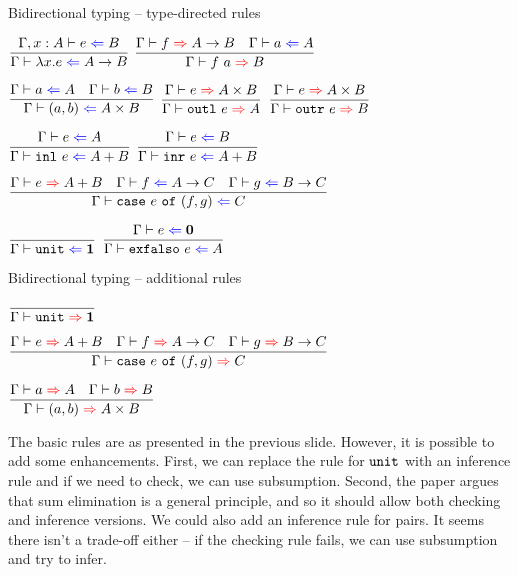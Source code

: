 \documentclass{beamer}
\begin{document}
\begin{frame}{Bidirectional typing -- type-directed rules}

\begin{center}
  $\infrule{\fullcheck{\extend{\Gamma}{x}{A}}{e}{B}}{\check{\fun{x}{e}}{\Fun{A}{B}}}$ \quad
  $\infrule{\infer{f}{\Fun{A}{B}} \quad \check{a}{A}}{\infer{\app{f}{a}}{B}}$

  \vspace{2em}

  $\infrule{\check{a}{A} \quad \check{b}{B}}{\check{\pair{a}{b}}{\Prod{A}{B}}}$ \quad
  $\infrule{\infer{e}{\Prod{A}{B}}}{\infer{\outl{e}}{A}}$ \quad
  $\infrule{\infer{e}{\Prod{A}{B}}}{\infer{\outr{e}}{B}}$

  \vspace{2em}

  $\infrule{\check{e}{A}}{\check{\inl{e}}{\Sum{A}{B}}}$ \quad
  $\infrule{\check{e}{B}}{\check{\inr{e}}{\Sum{A}{B}}}$

  \vspace{2em}

  $\infrule{\infer{e}{\Sum{A}{B}} \quad \check{f}{\Fun{A}{C}} \quad \check{g}{\Fun{B}{C}}}{\check{\case{e}{f}{g}}{C}}$

  \vspace{2em}

  $\infrule{}{\check{\unit}{\Unit}}$ \quad
  $\infrule{\check{e}{\Empty}}{\check{\exfalso{e}}{A}}$
\end{center}

\end{frame}

\begin{frame}{Bidirectional typing -- additional rules}

\begin{center}
  $\infrule{}{\infer{\unit}{\Unit}}$

  \vspace{1em}

  $\infrule{\infer{e}{\Sum{A}{B}} \quad \infer{f}{\Fun{A}{C}} \quad \infer{g}{\Fun{B}{C}}}{\infer{\case{e}{f}{g}}{C}}$

  \vspace{1em}

  $\infrule{\infer{a}{A} \quad \infer{b}{B}}{\infer{\pair{a}{b}}{\Prod{A}{B}}}$
\end{center}

\vspace{1em}

The basic rules are as presented in the previous slide. However, it is possible to add some enhancements. First, we can replace the rule for $\texttt{unit}$ with an inference rule and if we need to check, we can use subsumption. Second, the paper argues that sum elimination is a general principle, and so it should allow both checking and inference versions. We could also add an inference rule for pairs. It seems there isn't a trade-off either -- if the checking rule fails, we can use subsumption and try to infer.

\end{frame}
\end{document}
